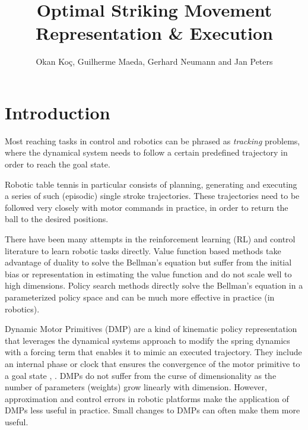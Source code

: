 \documentclass[10pt,a4paper]{article}
\author{Okan Ko\c c, Guilherme Maeda, Gerhard Neumann and Jan Peters}
\title{Optimal Striking Movement Representation \& Execution}
\begin{document}
\maketitle

\section{Introduction}\label{introduction}


Most reaching tasks in control and robotics can be phrased as \emph{tracking} problems, where the dynamical system needs to follow a certain predefined trajectory in order to reach the goal state. 

Robotic table tennis in particular consists of planning, generating and executing a series of such (episodic) single stroke trajectories. These trajectories need to be followed very closely with motor commands in practice, in order to return the ball to the desired positions. 

There have been many attempts in the reinforcement learning (RL) \cite{Sutton98} and control literature to learn robotic tasks directly. Value function based methods take advantage of duality to solve the Bellman's equation but suffer from the initial bias or representation in estimating the value function and do not scale well to high dimensions. Policy search methods directly solve the Bellman's equation in a parameterized policy space and can be much more effective in practice (in robotics). 

Dynamic Motor Primitives (DMP) are a kind of kinematic policy representation that leverages the dynamical systems approach to modify the spring dynamics with a forcing term that enables it to mimic an executed trajectory. They include an internal phase or clock that ensures the convergence of the motor primitive to a goal state \cite{Ijspeert13}, \cite{Schaal07}. DMPs do not suffer from the curse of dimensionality as the number of parameters (weights) grow linearly with dimension. However, approximation and control errors in robotic platforms make the application of DMPs less useful in practice. Small changes to DMPs can often make them more useful.

\end{document}
